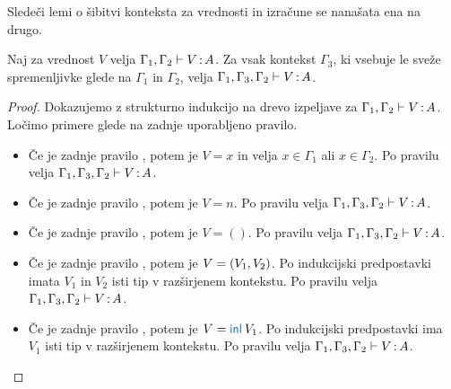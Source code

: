 Sledeči lemi o šibitvi konteksta za vrednosti in izračune se nanašata ena na drugo.

\begin{lema}\label{lem:weakening-values}
	Naj za vrednost $V$ velja $\Gamma_1, \Gamma_2 \vdash V \mathinner{:} A$. Za vsak kontekst $\Gamma_3$, ki vsebuje le sveže spremenljivke glede na $\Gamma_1$ in $\Gamma_2$, velja $\Gamma_1, \Gamma_3, \Gamma_2 \vdash V \mathinner{:} A$.
\end{lema}

\begin{proof}
	Dokazujemo z strukturno indukcijo na drevo izpeljave za $\Gamma_1, \Gamma_2 \vdash V \mathinner{:} A$.
	Ločimo primere glede na zadnje uporabljeno pravilo.
	
	\begin{itemize}
		\item[\sitem] Če je zadnje pravilo , potem je $V = x$ in velja $x \in \Gamma_1$ ali $x \in \Gamma_2$. Po pravilu  velja $\Gamma_1, \Gamma_3, \Gamma_2 \vdash V \mathinner{:} A$.
		
		\item Če je zadnje pravilo , potem je $V = n$. Po pravilu  velja $\Gamma_1, \Gamma_3, \Gamma_2 \vdash V \mathinner{:} A$.
		
		\item Če je zadnje pravilo , potem je $V = ()$. Po pravilu  velja $\Gamma_1, \Gamma_3, \Gamma_2 \vdash V \mathinner{:} A$.
		
		\item Če je zadnje pravilo , potem je $V =( V_1 , V_2 )$. Po indukcijski predpostavki imata $V_1$ in $V_2$ isti tip v razširjenem kontekstu.
		Po pravilu  velja $\Gamma_1, \Gamma_3, \Gamma_2 \vdash V \mathinner{:} A$.
		
		\item Če je zadnje pravilo , potem je $V = \tminl{V_1}$. Po indukcijski predpostavki ima $V_1$ isti tip v razširjenem kontekstu.
		Po pravilu  velja $\Gamma_1, \Gamma_3, \Gamma_2 \vdash V \mathinner{:} A$.
		

\end{itemize}
\end{proof}
